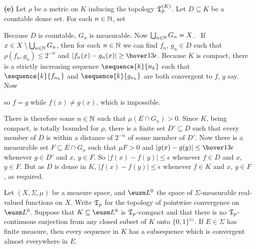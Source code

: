 {\medskip

{\bf (e)} Let $\rho$ be a metric on $K$ inducing the topology 
$\frak T_p^{(K)}$.   Let $D\subseteq K$ be a countable dense set.   For each
$n\in\Bbb N$, set


\noindent Because $D$ is countable, $G_n$ is measurable.   Now
$\bigcup_{n\in\Bbb N}G_n=X$.   \Prf\Quer\ If $x\in
X\setminus\bigcup_{n\in\Bbb N}G_n$, then for each $n\in\Bbb N$ we can
find $f_n$, $g_n\in D$ such that $\rho(f_n,g_n)\le 2^{-n}$ and
$|f_n(x)-g_n(x)|\ge\bover13\epsilon$.   Because $K$ is compact, there is
a strictly increasing sequence $\sequence{k}{n_k}$ such that
$\sequence{k}{f_{n_k}}$ and $\sequence{k}{g_{n_k}}$ are both convergent
to $f$, $g$ say.   Now


\noindent so $f=g$ while $f(x)\ne g(x)$, which is impossible.\ \Bang\Qed

There is therefore some $n\in\Bbb N$ such that $\mu(E\cap G_n)>0$.
Since $K$, being compact, is totally bounded for $\rho$, there is a
finite set $D'\subseteq D$ such that every member of $D$ is within a
distance of $2^{-n}$ of some member of $D'$.   Now there is a measurable
set $F\subseteq E\cap G_n$ such that $\mu F>0$ and
$|g(x)-g(y)|\le\bover13\epsilon$ whenever $g\in D'$ and $x$, $y\in F$.
So $|f(x)-f(y)|\le\epsilon$ whenever $f\in D$ and $x$, $y\in F$.   But
as $D$ is dense in $K$, $|f(x)-f(y)|\le\epsilon$ whenever $f\in K$ and
$x$, $y\in F$, as required.
}%

 Let $(X,\Sigma,\mu)$ be a measure space, and
$\eusm L^0$ the space of $\Sigma$-measurable real-valued functions on
$X$.   Write $\frak T_p$ for the topology of pointwise
convergence on $\eusm L^0$.   Suppose that
$K\subseteq\eusm L^0$ is $\frak T_p$-compact and that there is no
$\frak T_p$-continuous surjection from any closed subset of $K$ onto
$\{0,1\}^{\omega_1}$.   If $E\in\Sigma$ has finite measure, then every sequence in $K$ has a subsequence which is convergent almost everywhere in $E$.

